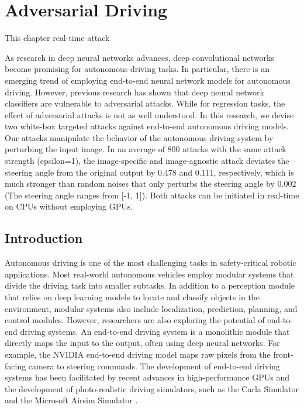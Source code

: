 \chapter{Adversarial Driving}
\label{chpt:driving}


This chapter real-time attack

As research in deep neural networks advances, deep convolutional networks become promising for autonomous driving tasks. In particular, there is an emerging trend of employing end-to-end neural network models for autonomous driving. However, previous research has shown that deep neural network classifiers are vulnerable to adversarial attacks. While for regression tasks, the effect of adversarial attacks is not as well understood. In this research, we devise two white-box targeted attacks against end-to-end autonomous driving models. Our attacks manipulate the behavior of the autonomous driving system by perturbing the input image. In an average of 800 attacks with the same attack strength (epsilon=1), the image-specific and image-agnostic attack deviates the steering angle from the original output by 0.478 and 0.111, respectively, which is much stronger than random noises that only perturbs the steering angle by 0.002 (The steering angle ranges from [-1, 1]). Both attacks can be initiated in real-time on CPUs without employing GPUs. 



\section{Introduction}

Autonomous driving is one of the most challenging tasks in safety-critical robotic applications. Most real-world autonomous vehicles employ modular systems that divide the driving task into smaller subtasks. In addition to a perception module that relies on deep learning models to locate and classify objects in the environment, modular systems also include localization, prediction, planning, and control modules. However, researchers are also exploring the potential of end-to-end driving systems. An end-to-end driving system is a monolithic module that directly maps the input to the output, often using deep neural networks. For example, the NVIDIA end-to-end driving model \cite{bojarski2016end} maps raw pixels from the front-facing camera to steering commands. The development of end-to-end driving systems has been facilitated by recent advances in high-performance GPUs and the development of photo-realistic driving simulators, such as the Carla Simulator \cite{Dosovitskiy17} and the Microsoft Airsim Simulator \cite{airsim2017fsr}.  

